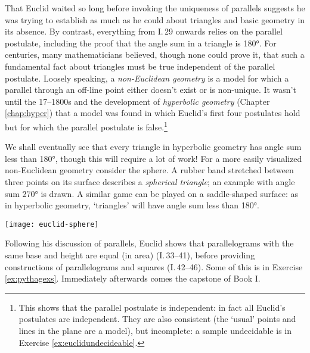 That Euclid waited so long before invoking the uniqueness of parallels suggests he was trying to establish as much as he could about triangles and basic geometry in its absence. By contrast, everything from I.\,29 onwards relies on the parallel postulate, including the proof that the angle sum in a triangle is \ang{180}. For centuries, many mathematicians believed, though none could prove it, that such a fundamental fact about triangles must be true independent of the parallel postulate.\smallbreak
Loosely speaking, a \emph{non-Euclidean geometry} is a model for which a parallel through an off-line point either doesn't exist or is non-unique. It wasn't until the 17--1800s and the development of \emph{hyperbolic geometry} (Chapter \ref{chap:hyper}) that a model was found in which Euclid's first four postulates hold but for which the parallel postulate is false.\footnote{This shows that the parallel postulate is independent: in fact all Euclid's postulates are independent. They are also consistent (the `usual' points and lines in the plane are a model), but incomplete: a sample undecidable is in Exercise \ref{ex:euclidundecideable}.}\par

\begin{minipage}[t]{0.76\linewidth}\vspace{-5pt}
	We shall eventually see that every triangle in hyperbolic geometry has angle sum less than \ang{180}, though this will require a lot of work! For a more easily visualized non-Euclidean geometry consider the sphere. A rubber band stretched between three points on its surface describes a \emph{spherical triangle}; an example with angle sum \ang{270} is drawn. A similar game can be played on a saddle-shaped surface: as in hyperbolic geometry, `triangles' will have angle sum less than \ang{180}.
\end{minipage}
\hfill
\begin{minipage}[t]{0.23\linewidth}\vspace{-10pt}
	\flushright
	\texttt{[image: euclid-sphere]}
\end{minipage}

\goodbreak

\goodbreak



Following his discussion of parallels, Euclid shows that parallelograms with the same base and height are equal (in area) (I.\,33--41), before providing constructions of parallelograms and squares (I.\,42--46). Some of this is in Exercise \ref{ex:pythagexs}. Immediately afterwards comes the capstone of Book I.


